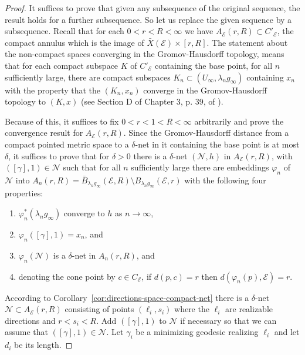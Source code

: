 \begin{proof}
It suffices to prove that given any subsequence of the original
sequence, the result holds for a further subsequence. So let us
replace the given sequence by a subsequence. Recall that for each
$0<r<R<\infty$ we have $A_{\mathcal E}(r,R)\subset C'_{\mathcal E}$,
the compact annulus which is the image of $\bar X({\mathcal
E})\times [r,R]$. The statement about the non-compact spaces
converging in the Gromov-Hausdorff topology, means that for each
compact subspace $K$ of $ C'_{\mathcal E}$ containing the base
point, for all $n$ sufficiently large, there are compact subspaces
$K_n\subset (U_\infty,\lambda_ng_\infty)$ containing $x_n$ with the
property that the $(K_n,x_n)$ converge in the Gromov-Hausdorff
topology to $(K,x)$ (see Section D of Chapter 3, p. 39, of
\cite{Gromov}).

Because of this, it suffices to  fix $0<r<1<R<\infty$ arbitrarily
and prove the convergence result for $A_{\mathcal E}(r,R)$. Since
the Gromov-Hausdorff distance from a compact pointed metric space to
a $\delta$-net in it containing the base point is at most $\delta$,
it suffices to prove that for $\delta>0$ there is a $\delta$-net
$({\mathcal N},h)$ in $A_{\mathcal E}(r,R)$, with $([\gamma],1)\in
{\mathcal N}$ such that for all $n$ sufficiently large there are
embeddings $\varphi_n$ of ${\mathcal N}$ into $A_n(r,R)=\bar
B_{\lambda_ng_\infty}({\mathcal E},R)\setminus
B_{\lambda_ng_\infty}({\mathcal E},r)$  with the following four
properties:
\begin{enumerate}
\item[(1)]  $\varphi_n^*(\lambda_ng_\infty)$ converge to $h$ as $n\rightarrow\infty$,
\item[(2)] $\varphi_n([\gamma],1)=x_n$,
and
\item[(3)]  $\varphi_n({\mathcal N})$ is a $\delta$-net in $A_n(r,R)$, and
\item[(4)] denoting the cone point by $c\in C_{\mathcal E}$,
if $d(p,c)=r$ then $d(\varphi_n(p),{\mathcal E})=r$.
\end{enumerate}

According to Corollary~\ref{cor:directions-space-compact-net} there is a $\delta$-net
${\mathcal N}\subset A_{\mathcal E}(r,R)$ consisting of points
$(\ell_i,s_i)$ where the $\ell_i$ are realizable directions and
$r<s_i< R$. Add $([\gamma],1)$ to ${\mathcal N}$ if necessary so
that we can assume that $([\gamma],1)\in {\mathcal N}$. Let
$\gamma_i$ be a minimizing geodesic realizing $\ell_i$ and let $d_i$
be its length.


\end{proof}
